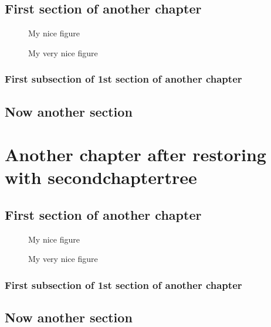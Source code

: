 \documentclass{book}
\begin{document}


\section{First section of another chapter}

\begin{figure}
\caption{My nice figure}
\end{figure}

\begin{figure}
\caption{My very nice figure}
\end{figure}


\subsection{First subsection of 1st section of another chapter}

\section{Now another section}




\chapter{Another chapter after restoring with secondchaptertree}



\section{First section of another chapter}

\begin{figure}
\caption{My nice figure}
\end{figure}

\begin{figure}
\caption{My very nice figure}
\end{figure}


\subsection{First subsection of 1st section of another chapter}

\section{Now another section}
\end{document}
